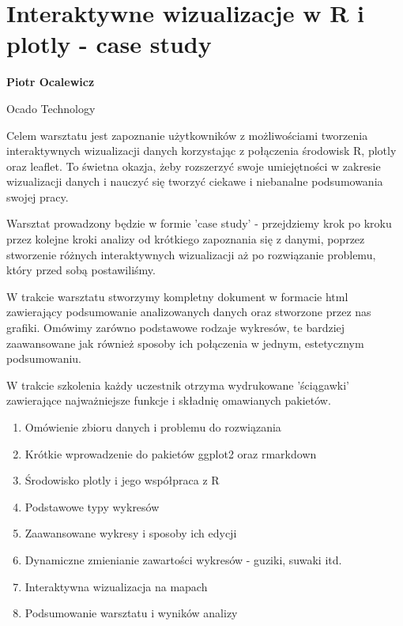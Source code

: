 \documentclass[\main/boa.tex]{subfiles}
\begin{document}
\section{Interaktywne wizualizacje w R i plotly - case study}

\begin{minipage}{0.915\textwidth}
\centering
{\bf {} Piotr Ocalewicz}
\end{minipage}

\vskip 0.3cm

\begin{affiliations}
\begin{minipage}{0.915\textwidth}
\centering
\large Ocado Technology  \\[2pt]
\end{minipage}
\end{affiliations}

\vskip 0.8cm

\opiswarsztatu Celem warsztatu jest zapoznanie użytkowników z możliwościami tworzenia interaktywnych wizualizacji danych korzystając z połączenia środowisk R, plotly oraz leaflet. To świetna okazja, żeby rozszerzyć swoje umiejętności w zakresie wizualizacji danych i nauczyć się tworzyć ciekawe i niebanalne podsumowania swojej pracy.

Warsztat prowadzony będzie w formie 'case study' - przejdziemy krok po kroku przez kolejne kroki analizy od krótkiego zapoznania się z danymi, poprzez stworzenie różnych interaktywnych wizualizacji aż po rozwiązanie problemu, który przed sobą postawiliśmy.

W trakcie warsztatu stworzymy kompletny dokument w formacie html zawierający podsumowanie analizowanych danych oraz stworzone przez nas grafiki. Omówimy zarówno podstawowe rodzaje wykresów, te bardziej zaawansowane jak również sposoby ich połączenia w jednym, estetycznym podsumowaniu.

W trakcie szkolenia każdy uczestnik otrzyma wydrukowane 'ściągawki' zawierające najważniejsze funkcje i składnię omawianych pakietów.

\planwarsztatu
\begin{enumerate}
\item Omówienie zbioru danych i problemu do rozwiązania
\item Krótkie wprowadzenie do pakietów ggplot2 oraz rmarkdown
\item Środowisko plotly i jego współpraca z R
\item Podstawowe typy wykresów
\item Zaawansowane wykresy i sposoby ich edycji
\item Dynamiczne zmienianie zawartości wykresów - guziki, suwaki itd.
\item Interaktywna wizualizacja na mapach
\item Podsumowanie warsztatu i wyników analizy
\end{enumerate}	 
\end{document}
